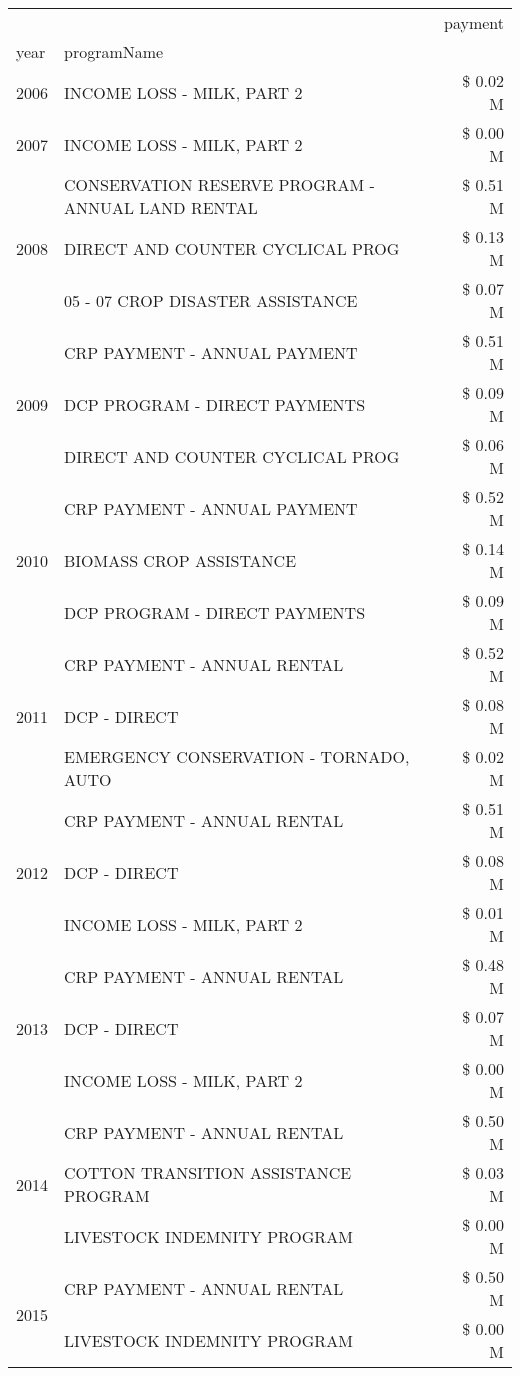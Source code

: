 \begin{tabular}{llr}
\toprule
 &  & payment \\
year & programName &  \\
\midrule
2006 & INCOME LOSS - MILK, PART 2 & \$ 0.02 M \\
\cline{1-3}
2007 & INCOME LOSS - MILK, PART 2 & \$ 0.00 M \\
\cline{1-3}
\multirow[t]{3}{*}{2008} & CONSERVATION RESERVE PROGRAM - ANNUAL LAND RENTAL & \$ 0.51 M \\
 & DIRECT AND COUNTER CYCLICAL PROG & \$ 0.13 M \\
 & 05 - 07 CROP DISASTER ASSISTANCE & \$ 0.07 M \\
\cline{1-3}
\multirow[t]{3}{*}{2009} & CRP PAYMENT - ANNUAL PAYMENT & \$ 0.51 M \\
 & DCP PROGRAM - DIRECT PAYMENTS & \$ 0.09 M \\
 & DIRECT AND COUNTER CYCLICAL PROG & \$ 0.06 M \\
\cline{1-3}
\multirow[t]{3}{*}{2010} & CRP PAYMENT - ANNUAL PAYMENT & \$ 0.52 M \\
 & BIOMASS CROP ASSISTANCE & \$ 0.14 M \\
 & DCP PROGRAM - DIRECT PAYMENTS & \$ 0.09 M \\
\cline{1-3}
\multirow[t]{3}{*}{2011} & CRP PAYMENT - ANNUAL RENTAL & \$ 0.52 M \\
 & DCP - DIRECT & \$ 0.08 M \\
 & EMERGENCY CONSERVATION - TORNADO, AUTO & \$ 0.02 M \\
\cline{1-3}
\multirow[t]{3}{*}{2012} & CRP PAYMENT - ANNUAL RENTAL & \$ 0.51 M \\
 & DCP - DIRECT & \$ 0.08 M \\
 & INCOME LOSS - MILK, PART 2 & \$ 0.01 M \\
\cline{1-3}
\multirow[t]{3}{*}{2013} & CRP PAYMENT - ANNUAL RENTAL & \$ 0.48 M \\
 & DCP - DIRECT & \$ 0.07 M \\
 & INCOME LOSS - MILK, PART 2 & \$ 0.00 M \\
\cline{1-3}
\multirow[t]{3}{*}{2014} & CRP PAYMENT - ANNUAL RENTAL & \$ 0.50 M \\
 & COTTON TRANSITION ASSISTANCE PROGRAM & \$ 0.03 M \\
 & LIVESTOCK INDEMNITY PROGRAM & \$ 0.00 M \\
\cline{1-3}
\multirow[t]{3}{*}{2015} & CRP PAYMENT - ANNUAL RENTAL & \$ 0.50 M \\
 & LIVESTOCK INDEMNITY PROGRAM & \$ 0.00 M \\

\end{tabular}
